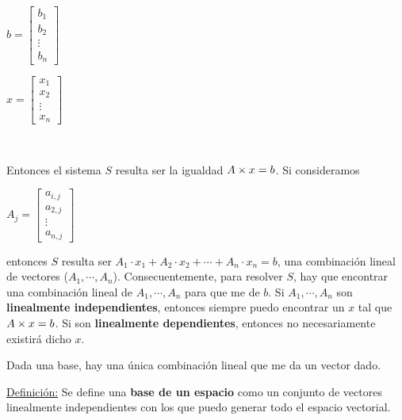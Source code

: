 \documentclass[]{article}
\begin{document}
\begin{minipage}[b]{0.5\linewidth}\centering
	\begin{center}
		$b = \begin{bmatrix}
			b_1 \\ b_2 \\ \vdots \\ b_n
	\end{bmatrix}$
\end{center}

\end{minipage}
\begin{minipage}[b]{0.2\linewidth}\centering
	\begin{center}
		$x = \begin{bmatrix}
			x_1 \\ x_2 \\ \vdots \\ x_n
		\end{bmatrix}$
	\end{center}
\end{minipage}

~\newline

Entonces el sistema $S$ resulta ser la igualdad $A\times x = b$. Si consideramos

\begin{center}

$A_j = \begin{bmatrix}a_{i,j}\\a_{2,j}\\ \vdots \\ a_{n,j}\end{bmatrix}$\end{center}

entonces $S$ resulta ser $A_1 \cdot x_1 + A_2 \cdot x_2 + \cdots + A_n \cdot x_n = b$, una combinación lineal de vectores ($A_1,\cdots,A_n$). Consecuentemente, para resolver $S$, hay que encontrar una combinación lineal de $A_1,\cdots,A_n$ para que me de $b$. Si $A_1,\cdots,A_n$ son \textbf{linealmente independientes}, entonces siempre puedo encontrar un $x$ tal que $A\times x = b$. Si son \textbf{linealmente dependientes}, entonces no necesariamente existirá dicho $x$.


Dada una base, hay una única combinación lineal que me da un vector dado.

\underline{Definición:} Se define una \textbf{base de un espacio} como un conjunto de vectores linealmente independientes con los que puedo generar todo el espacio vectorial.
\end{document}
